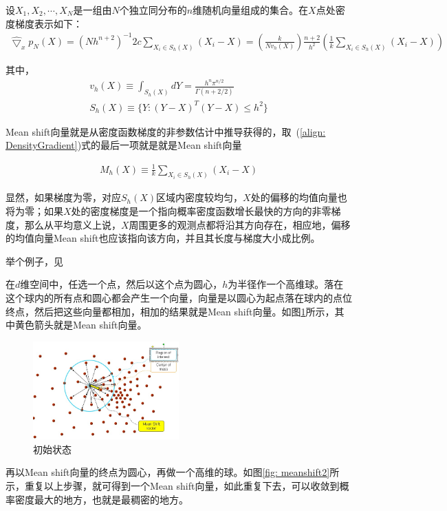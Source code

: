 \documentclass[12pt]{article}
\begin{document}
设$X_1, X_2, \cdots, X_N$是一组由$N$个独立同分布的$n$维随机向量组成的集合。在$X$点处密度梯度表示如下：
\begin{align}
\label{align: DensityGradient}
\hat{\bigtriangledown}_x p_N(X) = (Nh^{n+2})^{-1}2c \sum_{X_i \in S_h(X)} (X_i - X) = \left(\frac{k}{Nv_h(X)}\right) \frac{n+2}{h^2} \left(\frac{1}{k} \sum_{X_i \in S_h(X)} (X_i - X)\right)
\end{align}

其中，
\begin{align}
v_h(X) \equiv \int_{S_h(X)}dY = \frac{h^n\pi^{n/2}}{\Gamma(n+2/2)}\\
S_h(X) \equiv \{Y:(Y-X)^T(Y-X) \le h^2\}
\end{align}

Mean shift向量就是从密度函数梯度的非参数估计中推导获得的，取~(\ref{align: DensityGradient})式的最后一项就是就是Mean shift向量

\begin{align}
M_h(X) \equiv \frac{1}{k} \sum_{X_i \in S_h(X)} (X_i-X)
\end{align}

显然，如果梯度为零，对应$S_h(X)$区域内密度较均匀，$X$处的偏移的均值向量也将为零；如果$X$处的密度梯度是一个指向概率密度函数增长最快的方向的非零梯度，那么从平均意义上说，$X$周围更多的观测点都将沿其方向存在，相应地，偏移的均值向量Mean shift也应该指向该方向，并且其长度与梯度大小成比例。

举个例子，见\cite{MeanShiftExample}

在$d$维空间中，任选一个点，然后以这个点为圆心，$h$为半径作一个高维球。落在这个球内的所有点和圆心都会产生一个向量，向量是以圆心为起点落在球内的点位终点，然后把这些向量都相加，相加的结果就是Mean shift向量。如图\ref{fig: meanshift1}所示，其中黄色箭头就是Mean shift向量。

\begin{figure}[!ht]
\centering
\includegraphics[width=0.5\textwidth]{meanshift1.jpg}
\caption{初始状态}
\label{fig: meanshift1}
\end{figure} 


再以Mean shift向量的终点为圆心，再做一个高维的球。如图\ref{fig: meanshift2}所示，重复以上步骤，就可得到一个Mean shift向量，如此重复下去，可以收敛到概率密度最大的地方，也就是最稠密的地方。
\end{document}
